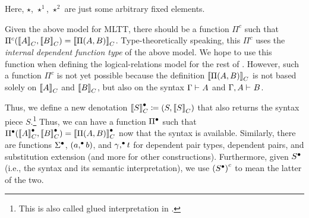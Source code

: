 Here, $\star$, $\star^1$, $\star^2$ are just some arbitrary fixed elements.  


Given the above model for MLTT, there should be a function ${\Pi}^c$ such
that ${\Pi}^c({{\llbracket {A} \rrbracket}_C},{{\llbracket {B} \rrbracket}_C}) = {\llbracket {\ensuremath{\Pi({A},{B})}} \rrbracket}_C$. 
Type-theoretically speaking, this ${\Pi}^c$ uses the \emph{internal dependent
function type} of
the above model. We hope to
use this function when defining the logical-relations model for the rest of \TT.
However, such a function $\Pi^c$ is not yet possible because the definition
${\llbracket {\ensuremath{\Pi({A},{B})}} \rrbracket}_C$ is not based solely on ${\llbracket {A} \rrbracket}_C$ and
${\llbracket {B} \rrbracket}_C$,
but also on the syntax $ {\Gamma} \vdash_{} {A} $ and $ {\Gamma, A} \vdash_{} {B} $. 

Thus, we define a new denotation ${\llbracket {S} \rrbracket}_C^\bullet \coloneq (S, {\llbracket {S} \rrbracket}_C)$
that also returns the syntax piece $S$.\footnote{This is also called
glued interpretation in \citet{sterling2019algebraic}.}
Thus, we can have a
function ${\Pi}^\bullet$ such that $\Pi^\bullet({{\llbracket {A} \rrbracket}_C^\bullet},{{\llbracket {B} \rrbracket}_C^\bullet}) =
{\llbracket {\ensuremath{\Pi({A},{B})}} \rrbracket}_C^\bullet$ now that the syntax is available.
Similarly, there are functions ${\Sigma}^\bullet$, $({a},^\bullet{b})$, and
${\gamma},^\bullet{t}$ for dependent pair types, dependent pairs, and
substitution extension (and more for other constructions).
Furthermore, given ${S}^\bullet$ (i.e., the syntax and its semantic interpretation),
we use ${({{S}^\bullet})}^c$ to mean the latter of the two.%

